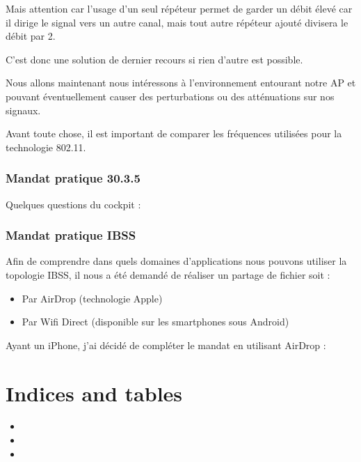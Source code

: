 \documentclass[letterpaper,10pt,french]{sphinxmanual}
\begin{document}
\sphinxAtStartPar
Mais attention car l’usage d’un seul répéteur permet de garder un débit élevé car il dirige le signal vers un autre canal, mais tout autre répéteur ajouté divisera le débit par 2.

\sphinxAtStartPar
C’est donc une solution de dernier recours si rien d’autre est possible.

\sphinxAtStartPar
Nous allons maintenant nous intéressons à l’environnement entourant notre AP et pouvant éventuellement causer des perturbations ou des atténuations sur nos signaux.

\sphinxAtStartPar
Avant toute chose, il est important de comparer les fréquences utilisées pour la technologie 802.11.


\subsection{Mandat pratique 30.3.5}
\label{\detokenize{Documentation-M144:mandat-pratique-30-3-5}}
\sphinxAtStartPar
Quelques questions du cockpit :


\subsection{Mandat pratique IBSS}
\label{\detokenize{Documentation-M144:mandat-pratique-ibss}}
\sphinxAtStartPar
Afin de comprendre dans quels domaines d’applications nous pouvons utiliser la topologie IBSS, il nous a été demandé de réaliser un partage de fichier soit :
\begin{itemize}
\item {} 
\sphinxAtStartPar
Par AirDrop (technologie Apple)

\item {} 
\sphinxAtStartPar
Par Wifi Direct (disponible sur les smartphones sous Android)

\end{itemize}

\sphinxAtStartPar
Ayant un iPhone, j’ai décidé de compléter le mandat en utilisant AirDrop :


\chapter{Indices and tables}
\label{\detokenize{index:indices-and-tables}}\begin{itemize}
\item {} 
\sphinxAtStartPar
{}

\item {} 
\sphinxAtStartPar
{}

\item {} 
\sphinxAtStartPar
{}

\end{itemize}



\renewcommand{\indexname}{Index}
\printindex
\end{document}

